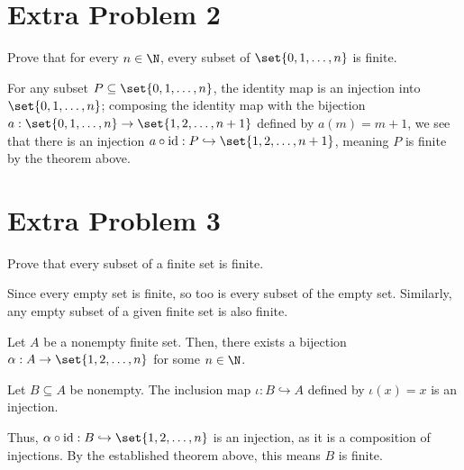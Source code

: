 \documentclass[10pt]{mypackage}
\begin{document}
\section{Extra Problem 2}%
\begin{problem}
  Prove that for every $n\in \N$, every subset of $\set{0,1,\dots,n}$ is finite.
\end{problem}
\begin{solution}
  For any subset $P\subseteq \set{0,1,\dots,n}$, the identity map is an injection into $\set{0,1,\dots,n}$; composing the identity map with the bijection $a: \set{0,1,\dots,n} \rightarrow \set{1,2,\dots,n+1}$ defined by $a(m) = m+1$, we see that there is an injection $a\circ \text{id}: P\hookrightarrow \set{1,2,\dots,n+1}$, meaning $P$ is finite by the theorem above.
\end{solution}

\section{Extra Problem 3}%
\begin{problem}
  Prove that every subset of a finite set is finite.
\end{problem}
\begin{solution}
  Since every empty set is finite, so too is every subset of the empty set. Similarly, any empty subset of a given finite set is also finite.\newline

  Let $A$ be a nonempty finite set. Then, there exists a bijection $\alpha: A\rightarrow \set{1,2,\dots,n}$ for some $n\in\N$.\newline

  Let $B\subseteq A$ be nonempty. The inclusion map $\iota: B\hookrightarrow A$ defined by $\iota(x) = x$ is an injection.\newline

  Thus, $\alpha \circ \text{id}: B\hookrightarrow \set{1,2,\dots,n}$ is an injection, as it is a composition of injections. By the established theorem above, this means $B$ is finite.
\end{solution}
\end{document}
